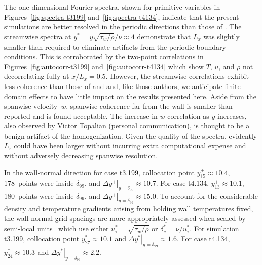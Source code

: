 The one-dimensional Fourier spectra, shown for primitive variables in
Figures~\ref{fig:spectra-t3199} and~\ref{fig:spectra-t4134}, indicate that the
present simulations are better resolved in the periodic directions than
those of \citeauthor{Coleman1995Numerical}.
%
The streamwise spectra at $y^{\ast}=y \sqrt{\tau_w / \rho} / \nu \approx{}4$ demonstrate that $L_x$ was
slightly smaller than required to eliminate artifacts from the periodic boundary
conditions.  This is corroborated by the two-point correlations in
Figures~\ref{fig:autocorr-t3199} and~\ref{fig:autocorr-t4134} which show $T$,
$u$, and $\rho$ not decorrelating fully at $x/L_x=0.5$.  However, the streamwise
correlations exhibit less coherence than those of
\citeauthor{Coleman1995Numerical} and \citeauthor{Guarini2000Direct} and, like
those authors, we anticipate finite domain effects to have little impact on the
results presented here.  Aside from the spanwise velocity~$w$, spanwise
coherence far from the wall is smaller than \citeauthor{Guarini2000Direct}
reported and is found acceptable.
%
The increase in $w$ correlation as $y$ increases, also observed by
Victor Topalian (personal communication), is thought to be a benign artifact of the
homogenization.
%
Given the quality of the spectra, evidently $L_z$ could have been larger without
incurring extra computational expense and without adversely decreasing spanwise
resolution.

In the wall-normal direction for case t3.199, collocation point
$y_{15}^{+}\approx{}10.4$, 178~points were inside $\delta_{99}$,
and $\left.\Delta{}y^{+}\right|_{y=\delta_{99}} \approx 10.7$.
For case t4.134, $y_{13}^{+}\approx{}10.1$, 180~points were inside
$\delta_{99}$, and $\left.\Delta{}y^{+}\right|_{y=\delta_{99}}
\approx 15.0$.  To account for the considerable density and
temperature gradients arising from holding wall temperatures
fixed, the wall-normal grid spacings are more appropriately
assessed when scaled by semi-local units~\citep{Huang1995Compressible,Morinishi2005Study}
%
which use either $u^\ast_\tau = \sqrt{\tau_w / \rho}$ or $\delta^\ast_\nu = \nu / u^\ast_\tau$.
For simulation t3.199, collocation point
$y_{27}^{*}\approx{}10.1$ and $\left.\Delta{}y^{*}\right|_{y=\delta_{99}}
\approx 1.6$.  For case t4.134, $y_{24}^{*}\approx{}10.3$ and
$\left.\Delta{}y^{*}\right|_{y=\delta_{99}} \approx 2.2$.


